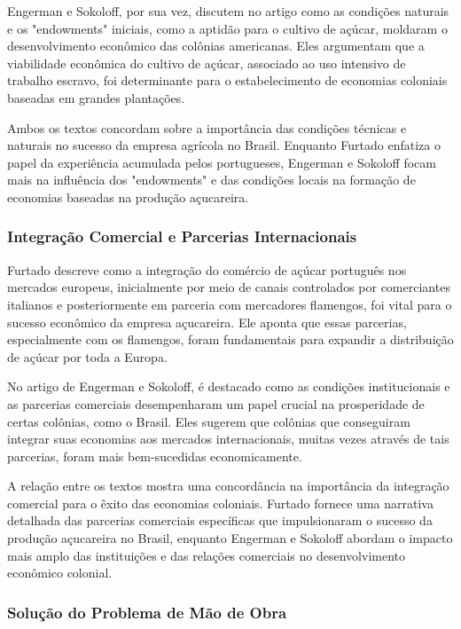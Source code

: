 \documentclass[a4paper,12pt]{article}[abntex2]
\begin{document}
Engerman e Sokoloff, por sua vez, discutem no artigo como as condições naturais e os "endowments" iniciais, como a aptidão para o cultivo de açúcar, moldaram o desenvolvimento econômico das colônias americanas. Eles argumentam que a viabilidade econômica do cultivo de açúcar, associado ao uso intensivo de trabalho escravo, foi determinante para o estabelecimento de economias coloniais baseadas em grandes plantações.

Ambos os textos concordam sobre a importância das condições técnicas e naturais no sucesso da empresa agrícola no Brasil. Enquanto Furtado enfatiza o papel da experiência acumulada pelos portugueses, Engerman e Sokoloff focam mais na influência dos "endowments" e das condições locais na formação de economias baseadas na produção açucareira.

\subsubsection*{Integração Comercial e Parcerias Internacionais}

Furtado descreve como a integração do comércio de açúcar português nos mercados europeus, inicialmente por meio de canais controlados por comerciantes italianos e posteriormente em parceria com mercadores flamengos, foi vital para o sucesso econômico da empresa açucareira. Ele aponta que essas parcerias, especialmente com os flamengos, foram fundamentais para expandir a distribuição de açúcar por toda a Europa.

No artigo de Engerman e Sokoloff, é destacado como as condições institucionais e as parcerias comerciais desempenharam um papel crucial na prosperidade de certas colônias, como o Brasil. Eles sugerem que colônias que conseguiram integrar suas economias aos mercados internacionais, muitas vezes através de tais parcerias, foram mais bem-sucedidas economicamente.

A relação entre os textos mostra uma concordância na importância da integração comercial para o êxito das economias coloniais. Furtado fornece uma narrativa detalhada das parcerias comerciais específicas que impulsionaram o sucesso da produção açucareira no Brasil, enquanto Engerman e Sokoloff abordam o impacto mais amplo das instituições e das relações comerciais no desenvolvimento econômico colonial.

\subsubsection*{Solução do Problema de Mão de Obra}
\end{document}
